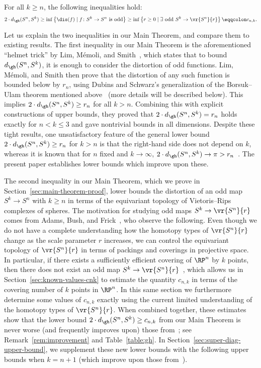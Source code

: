 \documentclass[11pt, reqno, english]{amsart}
\begin{document}
\begin{theorem-main}
For all $k \ge n$, the following inequalities hold:
\[
2\cdot d_{\gh}(S^n, S^k)
\ge \inf \left\{ \dis(f) \mid f \colon S^k \to S^n \textnormal{ is odd}\right\}
\ge \inf \left\{r\ge 0 \mid \exists \textnormal{ odd }S^k \to \vr{S^n}{r}\right\} \eqqcolon c_{n,k}.
\]
\end{theorem-main}

Let us explain the two inequalities in our Main Theorem, and compare them to existing results.
The first inequality in our Main Theorem is the aforementioned ``helmet trick'' by Lim, M\'{e}moli, and Smith~\cite[Lemma~5.5]{lim2021gromov}, which states that to bound $d_{\gh}(S^n,S^k)$, it is enough to consider the distortion of odd functions.
Lim, M\'{e}moli, and Smith then prove that the distortion of any such function is bounded below by $r_n$, using Dubins and Schwarz's generalization of the Borsuk--Ulam theorem mentioned above~\cite{dubins1981equidiscontinuity} (more details will be described below).
This implies $2\cdot d_{\gh}(S^n,S^k)\geq r_n$ for all $k>n$.
Combining this with explicit constructions of upper bounds, they proved that $2\cdot d_{\gh}(S^n,S^k)=r_n$ holds exactly for $n < k\le 3$ and gave nontrivial bounds in all dimensions.
Despite these tight results, one  unsatisfactory feature of the general lower bound $2\cdot d_{\gh}(S^n,S^k)\geq r_n$ for $k>n$ is that the right-hand side does not depend on $k$, whereas it is known that for $n$ fixed and $k\to \infty$, $2\cdot d_{\gh}(S^n,S^k)\to \pi > r_n$~\cite[Proposition 1.8]{lim2021gromov}.
The present paper establishes lower bounds which improve upon these.

The second inequality in our Main Theorem, which we prove in Section~\ref{sec:main-theorem-proof}, lower bounds the distortion of an odd map $S^k\to S^n$ with $k\ge n$ in terms of the equivariant topology of Vietoris--Rips complexes of spheres.
The motivation for studying odd maps $S^k \to \vr{S^n}{r}$ comes from Adams, Bush, and Frick~\cite{ABF2}, who observe the following.
Even though we do not have a complete understanding how the homotopy types of $\vr{S^n}{r}$ change as the scale parameter $r$ increases, we can control the equivariant topology of $\vr{S^n}{r}$ in terms of packings and coverings in projective space.
In particular, if there exists a sufficiently efficient covering of $\RP^n$ by $k$ points, then there does not exist an odd map $S^k \to \vr{S^n}{r}$~\cite{ABF2}, which allows us in Section~\ref{sec:known-values-cnk} to estimate the quantity $c_{n,k}$ in terms of the covering number of $k$ points in $\RP^n$.
In this same section we furthermore determine some values of $c_{n,k}$ exactly using the current limited understanding of the homotopy types of $\vr{S^n}{r}$.
When combined together, these estimates show that the lower bound $2\cdot d_{\gh}(S^n,S^k)\ge c_{n,k}$ from our Main Theorem is never worse (and frequently improves upon) those from~\cite{lim2021gromov}; see Remark~\ref{rem:improvement} and Table~\ref{table:gh}.
In Section~\ref{sec:super-diag-upper-bound}, we supplement these new lower bounds with the following  upper bounds when $k = n +1$ (which improve upon those from~\cite{lim2021gromov}).
\end{document}
